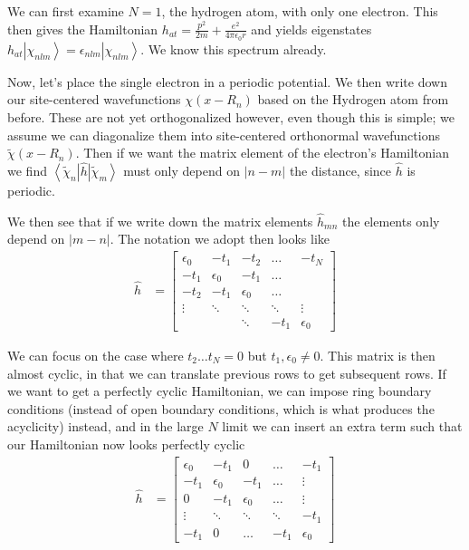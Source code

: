 \documentclass[10pt]{report}
\newcommand{\bra}[1]{\left<#1\right|}
\newcommand{\ket}[1]{\left|#1\right>}
\newcommand{\abs}[1]{\left|#1\right|}
\begin{document}
We can first examine $N=1$, the hydrogen atom, with only one electron. This then gives the Hamiltonian $h_{at} = \frac{p^2}{2m} + \frac{e^2}{4\pi\epsilon_0 r}$ and yields eigenstates $h_{at} \ket{\chi_{nlm}} = \epsilon_{nlm}\ket{\chi_{nlm}}$. We know this spectrum already.

Now, let's place the single electron in a periodic potential. We then write down our site-centered wavefunctions $\chi(x - R_n)$ based on the Hydrogen atom from before. These are not yet orthogonalized however, even though this is simple; we assume we can diagonalize them into site-centered orthonormal wavefunctions $\tilde{\chi}(x - R_n)$. Then if we want the matrix element of the electron's Hamiltonian we find $\bra{\tilde{\chi}_n}\hat{h}\ket{\tilde{\chi}_m}$ must only depend on $\abs{n-m}$ the distance, since $\hat{h}$ is periodic.

We then see that if we write down the matrix elements $\hat{h}_{mn}$ the elements only depend on $\abs{m-n}$. The notation we adopt then looks like
\begin{align}
    \hat{h} &= \begin{bmatrix} \epsilon_0 & -t_1 & -t_2 & \dots & -t_N\\
    -t_1 & \epsilon_0 & -t_1 & \dots & \\
    -t_2 & -t_1 & \epsilon_0 & \dots &\\
    \vdots & \ddots & \ddots & \ddots & \vdots\\
    & &  \ddots & -t_1 &\epsilon_0\end{bmatrix} 
\end{align}

We can focus on the case where $t_2\dots t_N = 0$ but $t_1, \epsilon_0 \neq 0$. This matrix is then almost cyclic, in that we can translate previous rows to get subsequent rows. If we want to get a perfectly cyclic Hamiltonian, we can impose ring boundary conditions (instead of open boundary conditions, which is what produces the acyclicity) instead, and in the large $N$ limit we can insert an extra term such that our Hamiltonian now looks perfectly cyclic
\begin{align}
    \hat{h} &= \begin{bmatrix} \epsilon_0 & -t_1 &0& \dots &-t_1\\
    -t_1 & \epsilon_0 & -t_1 & \dots & \vdots\\
    0 & -t_1 & \epsilon_0 & \dots &\vdots\\
    \vdots & \ddots & \ddots & \ddots & -t_1 \\
    -t_1 & 0 &\dots & -t_1 & \epsilon_0\end{bmatrix} 
\end{align}
\end{document}
